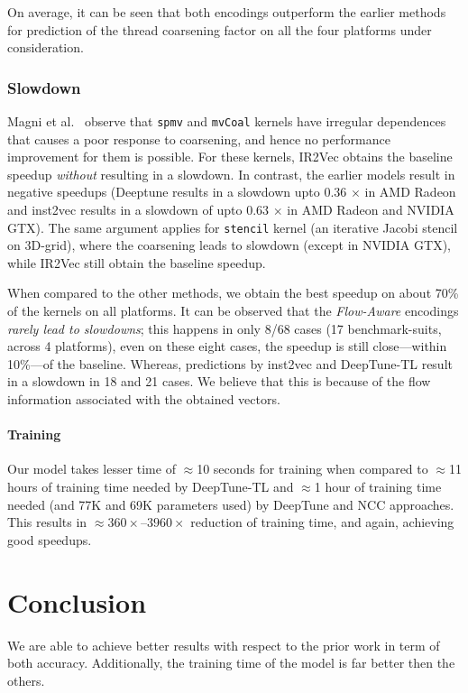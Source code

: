 On average, it can be seen that both encodings outperform the earlier methods for prediction of the thread coarsening factor on all the four platforms under consideration. 

\subsubsection{Slowdown}  Magni et al.~\cite{magni2014automatic} observe that \texttt{spmv} and \texttt{mvCoal} kernels have irregular dependences that causes a poor response to coarsening, and hence no performance improvement for them is possible.
For these kernels, IR2Vec obtains the baseline speedup \textit{without} resulting in a slowdown. In contrast, the earlier models result in negative speedups (Deeptune results in a slowdown upto $0.36$ $\times$ in AMD Radeon and inst2vec results in a slowdown of upto $0.63$ $\times$ in AMD Radeon and NVIDIA GTX). 
The same argument applies for \texttt{stencil} kernel (an iterative Jacobi stencil on 3D-grid), where the coarsening leads to slowdown (except in NVIDIA GTX), while IR2Vec still obtain the baseline speedup.

When compared to the other methods, we obtain the best speedup on about 70\% of the kernels on all platforms. 
It can be observed that the \textit{Flow-Aware} encodings \textit{rarely lead to slowdowns}; this happens in only 8/68 cases (17 benchmark-suits, across 4 platforms), even on these eight cases, the speedup is still close---within 10\%---of the baseline. 
Whereas, predictions by inst2vec and DeepTune-TL result in a slowdown in 18 and 21 cases.
We believe that this is because of the flow information associated with the obtained vectors.

\paragraph{Training}
Our model takes lesser time of $\approx$10 seconds for training when compared to $\approx$11 hours of training time needed by DeepTune-TL and $\approx$1 hour of training time needed (and 77K and 69K parameters used) by DeepTune and NCC approaches. 
This results in $\approx 360\times$--$3960\times$ reduction of training time, and again, achieving good speedups. 

\section{Conclusion}\label{sec:tc:conclusion}
We are able to achieve better results with respect to the prior work in term of both accuracy. Additionally, the training time of the model is far better then the others.